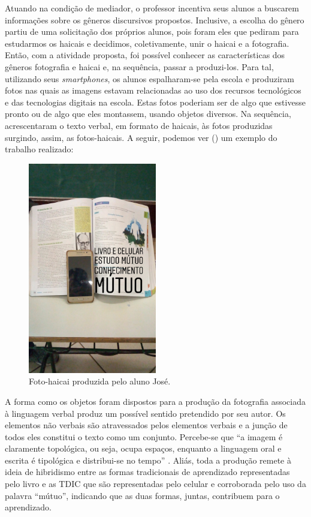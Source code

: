 \documentclass{textolivre}
\begin{document}
Atuando na condição de mediador, o professor incentiva seus alunos a buscarem informações sobre os gêneros discursivos propostos. Inclusive, a escolha do gênero partiu de uma solicitação dos próprios alunos, pois foram eles que pediram para estudarmos os haicais e decidimos, coletivamente, unir o haicai e a fotografia. Então, com a atividade proposta, foi possível conhecer as características dos gêneros fotografia e haicai e, na sequência, passar a produzi-los. Para tal, utilizando seus \emph{smartphones}, os alunos espalharam-se pela escola e produziram fotos nas quais as imagens estavam relacionadas ao uso dos recursos tecnológicos e das tecnologias digitais na escola. Estas fotos poderiam ser de algo que estivesse pronto ou de algo que eles montassem, usando objetos diversos. Na sequência, acrescentaram o texto verbal, em formato de haicais, às fotos produzidas surgindo, assim, as fotos-haicais. A seguir, podemos ver () um exemplo do trabalho realizado:

\begin{figure}[h]
    \centering
    \includegraphics[width=0.5\textwidth]{figure06.png}
    \caption{Foto-haicai produzida pelo aluno José.}
    \label{fig06}
\end{figure}

A forma como os objetos foram dispostos para a produção da fotografia associada à linguagem verbal produz um possível sentido pretendido por seu autor. Os elementos não verbais são atravessados pelos elementos verbais e a junção de todos eles constitui o texto como um conjunto. Percebe-se que “a imagem é claramente topológica, ou seja, ocupa espaços, enquanto a linguagem oral e escrita é tipológica e distribui-se no tempo” \cite[p. 22]{rojomoura2019}. Aliás, toda a produção remete à ideia de hibridismo entre as formas tradicionais de aprendizado representadas pelo livro e as TDIC que são representadas pelo celular e corroborada pelo uso da palavra “mútuo”, indicando que as duas formas, juntas, contribuem para o aprendizado.
\end{document}
